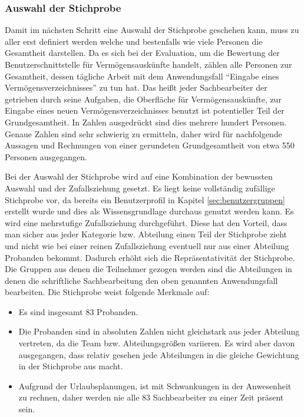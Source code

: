 
\subsubsection{Auswahl der Stichprobe}
Damit im nächsten Schritt eine Auswahl der Stichprobe geschehen kann, muss zu aller erst definiert werden welche und bestenfalls wie viele Personen die Gesamtheit darstellen. Da es sich bei der Evaluation, um die Bewertung der Benutzerschnittstelle für Vermögensauskünfte handelt, zählen alle Personen zur Gesamtheit, dessen tägliche Arbeit mit dem Anwendungsfall \enquote{Eingabe eines Vermögensverzeichnisses} zu tun hat. Das heißt jeder Sachbearbeiter der getrieben durch seine Aufgaben, die Oberfläche für Vermögensauskünfte, zur Eingabe eines neuen Vermögensverzeichnisses benutzt ist potentieller Teil der Grundgesamtheit. In Zahlen ausgedrückt sind dies mehrere hundert Personen. Genaue Zahlen sind sehr schwierig zu ermitteln, daher wird für nachfolgende Aussagen und Rechnungen von einer gerundeten Grundgesamtheit von etwa 550 Personen ausgegangen.

Bei der Auswahl der Stichprobe wird auf eine Kombination der bewussten Auswahl und der Zufallsziehung gesetzt. Es liegt keine vollständig zufällige Stichprobe vor, da bereits ein Benutzerprofil in Kapitel \ref{sec:benutzergruppen} erstellt wurde und dies als Wissensgrundlage durchaus genutzt werden kann. Es wird eine mehrstufige Zufallsziehung durchgeführt. Diese hat den Vorteil, dass man sicher aus jeder Kategorie bzw. Abteilung einen Teil der Stichprobe zieht und nicht wie bei einer reinen Zufallsziehung eventuell nur aus einer Abteilung Probanden bekommt. Dadurch erhöht sich die Repräsentativität der Stichprobe. Die Gruppen aus denen die Teilnehmer gezogen werden sind die Abteilungen in denen die schriftliche Sachbearbeitung den oben genannten Anwendungsfall bearbeiten. Die Stichprobe weist folgende Merkmale auf:
\begin{itemize}
    \item Es sind insgesamt 83 Probanden.
    \item Die Probanden sind in absoluten Zahlen nicht gleichstark aus jeder Abteilung vertreten, da die Team bzw. Abteilungsgrößen variieren. Es wird aber davon ausgegangen, dass relativ gesehen jede Abteilungen in die gleiche Gewichtung in der Stichprobe aus macht.
    \item Aufgrund der Urlaubsplanungen, ist mit Schwankungen in der Anwesenheit zu rechnen, daher werden nie alle 83 Sachbearbeiter zu einer Zeit präsent sein.
\end{itemize}

